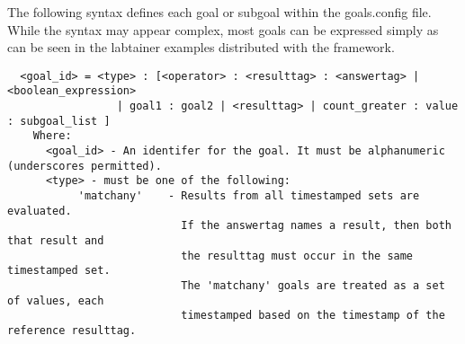 \documentclass{article}
\begin{document}
The following syntax defines each goal or subgoal within the goals.config file.  While the syntax
may appear complex, most goals can be expressed simply as can be seen in the labtainer examples distributed
with the framework.

\begin{verbatim}
  <goal_id> = <type> : [<operator> : <resulttag> : <answertag> | <boolean_expression> 
                 | goal1 : goal2 | <resulttag> | count_greater : value : subgoal_list ]
    Where: 
      <goal_id> - An identifer for the goal. It must be alphanumeric (underscores permitted).
      <type> - must be one of the following:
           'matchany'    - Results from all timestamped sets are evaluated.
                           If the answertag names a result, then both that result and
                           the resulttag must occur in the same timestamped set.
                           The 'matchany' goals are treated as a set of values, each 
                           timestamped based on the timestamp of the reference resulttag.
                        

\end{verbatim}
\end{document}
